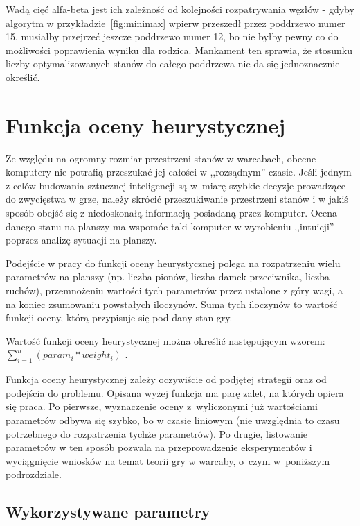 Wadą cięć alfa-beta jest ich zależność od kolejności rozpatrywania węzłów - gdyby algorytm w przykładzie~\ref{fig:minimax} wpierw przeszedł przez poddrzewo numer 15, musiałby przejrzeć jeszcze poddrzewo numer 12, bo nie byłby pewny co do możliwości poprawienia wyniku dla rodzica. Mankament ten sprawia, że stosunku liczby optymalizowanych stanów do całego poddrzewa nie da się jednoznacznie określić.

\section{Funkcja oceny heurystycznej}

Ze względu na ogromny rozmiar przestrzeni stanów w warcabach, obecne komputery nie potrafią przeszukać jej całości w ,,rozsądnym'' czasie. Jeśli jednym z celów budowania sztucznej inteligencji są w~miarę szybkie decyzje prowadzące do zwycięstwa w grze, należy skrócić przeszukiwanie przestrzeni stanów i w jakiś sposób obejść się z niedoskonałą informacją posiadaną przez komputer. Ocena danego stanu na planszy ma wspomóc taki komputer w wyrobieniu ,,intuicji'' poprzez analizę sytuacji na planszy.

\FloatBarrier

Podejście w pracy do funkcji oceny heurystycznej polega na rozpatrzeniu wielu parametrów na planszy (np. liczba pionów, liczba damek przeciwnika, liczba ruchów), przemnożeniu wartości tych parametrów przez ustalone z góry wagi, a na koniec zsumowaniu powstałych iloczynów. Suma tych iloczynów to wartość funkcji oceny, którą przypisuje się pod dany stan gry.

Wartość funkcji oceny heurystycznej można określić następującym wzorem:
{\centering
$\sum_{i=1}^{n}(param_i * weight_i)$
}.

Funkcja oceny heurystycznej zależy oczywiście od podjętej strategii oraz od podejścia do problemu. Opisana wyżej funkcja ma parę zalet, na których opiera się praca. Po pierwsze, wyznaczenie oceny z~wyliczonymi już wartościami parametrów odbywa się szybko, bo w czasie liniowym (nie uwzględnia to czasu potrzebnego do rozpatrzenia tychże parametrów). Po drugie, listowanie parametrów w ten sposób pozwala na przeprowadzenie eksperymentów i wyciągnięcie wniosków na temat teorii gry w warcaby, o~czym w~poniższym podrozdziale.

\subsection{Wykorzystywane parametry}

